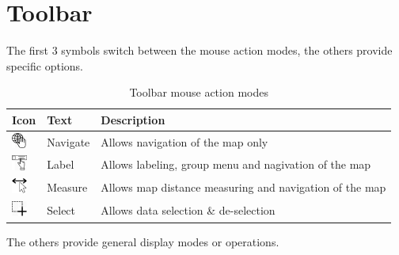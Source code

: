 \section{Toolbar}

The first 3 symbols switch between the mouse action modes, the others provide specific options.

\begin{table}[H]
  \center
  \begin{tabular}{ | l | l | l |}
    \hline
    \textbf{Icon} & \textbf{Text} &  \textbf{Description} \\ \hline
    \includegraphics[width=0.5cm]{../../data/icons/navigate.png} & Navigate & Allows navigation of the map only \\ \hline
    \includegraphics[width=0.5cm]{../../data/icons/label_action.png} & Label & Allows labeling, group menu and nagivation of the map \\ \hline
    \includegraphics[width=0.5cm]{../../data/icons/measure_action.png} & Measure & Allows map distance measuring and navigation of the map \\ \hline
    \includegraphics[width=0.5cm]{../../data/icons/select_action.png} & Select & Allows data selection \& de-selection \\ \hline
  \end{tabular}
  \caption{Toolbar mouse action modes}
\end{table}

The others provide general display modes or operations.

